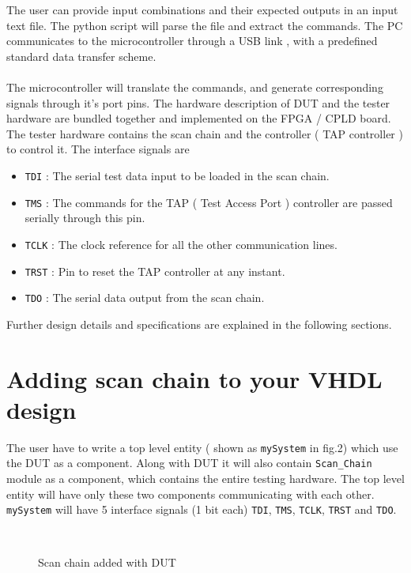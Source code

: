 \documentclass[a4paper,11pt]{article}
\begin{document}
The user can provide input combinations and their expected outputs in an input text file. The python script will parse the file and extract the commands. The PC communicates to the microcontroller through a USB link , with a predefined standard data transfer scheme. 
\paragraph*{}

The microcontroller will translate the commands, and generate corresponding signals through it's port pins. The hardware description of DUT and the tester hardware are bundled together and implemented on the FPGA / CPLD board. The tester hardware contains the scan chain and the controller ( TAP controller ) to control it. The interface signals are

\begin{itemize}
\item \texttt{TDI} : The serial test data input to be loaded in the scan chain.
\item \texttt{TMS} : The commands for the TAP ( Test Access Port ) controller are passed serially through this pin.
\item \texttt{TCLK} : The clock reference for all the other communication lines.
\item \texttt{TRST} : Pin to reset the TAP controller at any instant.
\item \texttt{TDO} : The serial data output from the scan chain.
\end{itemize}

Further design details and specifications are explained in the following sections.


\section{Adding scan chain to your VHDL design}

The user have to write a top level entity ( shown as \texttt{mySystem} in fig.2) which use the DUT as a component. Along with DUT it will also contain \texttt{Scan\_Chain} module as a component, which contains the entire testing hardware. The top level entity will have only these two components communicating with each other.
\texttt{mySystem} will have 5 interface signals (1 bit each) \texttt{TDI}, \texttt{TMS}, \texttt{TCLK}, \texttt{TRST} and \texttt{TDO}.
\begin{figure}[h!]
\centering
\\
\caption{Scan chain added with DUT}
\end{figure}
\end{document}
